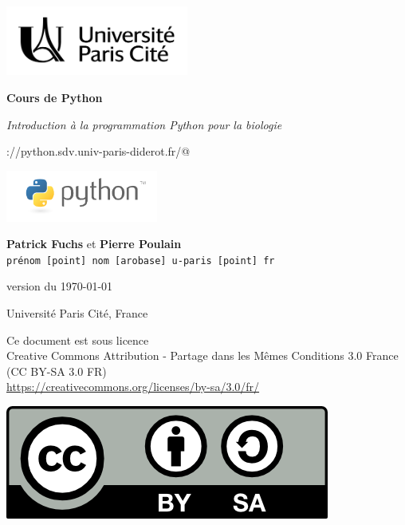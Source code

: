 \documentclass[10pt]{book}
\begin{document}
\thispagestyle{empty}

\begin{titlepage}

\begin{center}

\includegraphics[width=6cm]{img/logo_Univ_Paris_Cite.png}

\vspace{3cm}

{\Huge \bf Cours de Python}
\vspace{0.5cm}

{\itshape \Large
Introduction à la programmation Python pour la biologie
}
\vspace{0.5cm}

\verb@https://python.sdv.univ-paris-diderot.fr/@
\vspace{4cm}

\includegraphics[width=5cm]{img/logo_python.png} \\
\vspace{0.5cm}

{\large
	{\bf Patrick Fuchs} et {\bf Pierre Poulain} \\
	{\tt prénom [point] nom [arobase] u-paris [point] fr}
}
\vspace{4cm}

version du \today
\vspace{2cm}

Université Paris Cité, France

\vfill

\begin{minipage}{0.80\textwidth}
\footnotesize
Ce document est sous licence \\
Creative Commons Attribution - Partage dans les Mêmes Conditions 3.0 France \\
(CC BY-SA 3.0 FR) \\
\url{https://creativecommons.org/licenses/by-sa/3.0/fr/}
\end{minipage}
\begin{minipage}{0.15\textwidth}
\includegraphics{img/logo_CC-BY-SA.png}
\end{minipage}


\end{center}
\end{titlepage}
\end{document}
